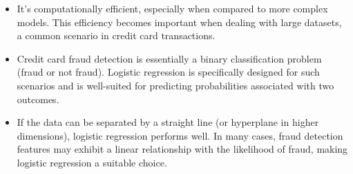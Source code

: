 \begin{itemize}
\item It's computationally efficient, especially when compared to more complex models. This efficiency becomes important when dealing with large datasets, a common scenario in credit card transactions.

\item Credit card fraud detection is essentially a binary classification problem (fraud or not fraud). Logistic regression is specifically designed for such scenarios and is well-suited for predicting probabilities associated with two outcomes.
\item If the data can be separated by a straight line (or hyperplane in higher dimensions), logistic regression performs well. In many cases, fraud detection features may exhibit a linear relationship with the likelihood of fraud, making logistic regression a suitable choice.





\end{itemize}
